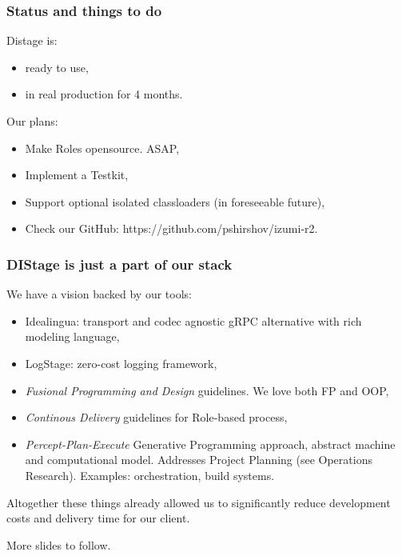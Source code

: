 \documentclass[usenames,dvipsnames]{beamer}
\begin{document}
\begin{frame}
\frametitle{Status and things to do}
Distage is:
\begin{itemize}
\item ready to use,
\item in real production for 4 months.
\end{itemize}
\vspace{0.3cm}
Our plans:
\begin{itemize}
\item Make Roles opensource. ASAP,
\item Implement a Testkit,
\item Support optional isolated classloaders (in foreseeable future),
\item Check our GitHub: https://github.com/pshirshov/izumi-r2.
\end{itemize}
\end{frame}

\begin{frame}
\frametitle{DIStage is just a part of our stack}
We have a vision backed by our tools:
\begin{itemize}
\item Idealingua: transport and codec agnostic gRPC alternative with rich modeling language,
\item LogStage: zero-cost logging framework,
\item \textit{Fusional Programming and Design} guidelines. We love both FP and OOP,
\item \textit{Continous Delivery} guidelines for Role-based process, 
\item \textit{Percept-Plan-Execute} Generative Programming approach, abstract machine and computational model.
Addresses Project Planning (see Operations Research). Examples: orchestration, build systems.
\end{itemize}

Altogether these things already allowed us to significantly reduce development costs and
delivery time for our client.\newline

More slides to follow.
\end{frame}
\end{document}
